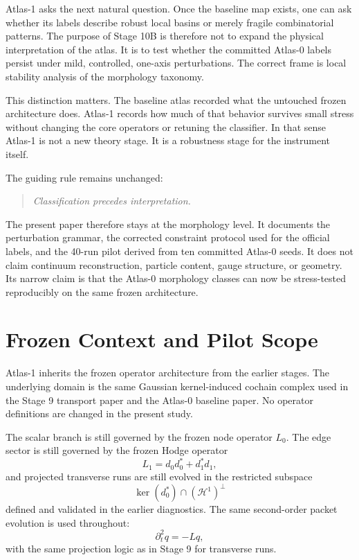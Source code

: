 \documentclass[11pt]{article}
\begin{document}
Atlas-1 asks the next natural question. Once the baseline map exists, one can ask whether its labels describe robust local basins or merely fragile combinatorial patterns. The purpose of Stage 10B is therefore not to expand the physical interpretation of the atlas. It is to test whether the committed Atlas-0 labels persist under mild, controlled, one-axis perturbations. The correct frame is local stability analysis of the morphology taxonomy.

This distinction matters. The baseline atlas recorded what the untouched frozen architecture does. Atlas-1 records how much of that behavior survives small stress without changing the core operators or retuning the classifier. In that sense Atlas-1 is not a new theory stage. It is a robustness stage for the instrument itself.

The guiding rule remains unchanged:
\begin{quote}
\emph{Classification precedes interpretation.}
\end{quote}

The present paper therefore stays at the morphology level. It documents the perturbation grammar, the corrected constraint protocol used for the official labels, and the 40-run pilot derived from ten committed Atlas-0 seeds. It does not claim continuum reconstruction, particle content, gauge structure, or geometry. Its narrow claim is that the Atlas-0 morphology classes can now be stress-tested reproducibly on the same frozen architecture.

\section{Frozen Context and Pilot Scope}
Atlas-1 inherits the frozen operator architecture from the earlier stages. The underlying domain is the same Gaussian kernel-induced cochain complex used in the Stage 9 transport paper and the Atlas-0 baseline paper. No operator definitions are changed in the present study.

The scalar branch is still governed by the frozen node operator $L_0$. The edge sector is still governed by the frozen Hodge operator
\begin{equation}
L_1 = d_0 d_0^{*} + d_1^{*} d_1,
\end{equation}
and projected transverse runs are still evolved in the restricted subspace
\begin{equation}
\ker(d_0^{*}) \cap (\mathcal{H}^1)^\perp
\end{equation}
defined and validated in the earlier diagnostics. The same second-order packet evolution is used throughout:
\begin{equation}
\partial_t^2 q = -L q,
\end{equation}
with the same projection logic as in Stage 9 for transverse runs.
\end{document}
